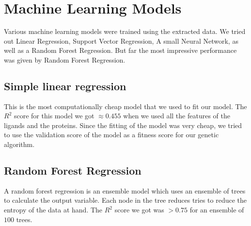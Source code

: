 \documentclass[11pt]{article}
\begin{document}

\section{Machine Learning Models}

Various machine learning models were trained using the extracted data.
We tried out Linear Regression,
Support Vector Regression,
A small Neural Network,
as well as a Random Forest Regression.
But far the most impressive performance was given by Random Forest Regression.

\subsection{Simple linear regression}
This is the most computationally cheap model that we used to fit our model.
The $R^2$ score for this model we got $\approx 0.455$ when we used all the
features of the ligands and the proteins.
Since the fitting of the model was very cheap, we tried to use the validation
score of the model as a fitness score for our genetic algorithm.


\subsection{Random Forest Regression}
A random forest regression is an ensemble model which uses an ensemble of trees
to calculate the output variable.
Each node in the tree reduces tries to reduce the entropy of the data at hand.
The $R^2$ score we got was $> 0.75$ for an ensemble of $100$ trees.
\end{document}
